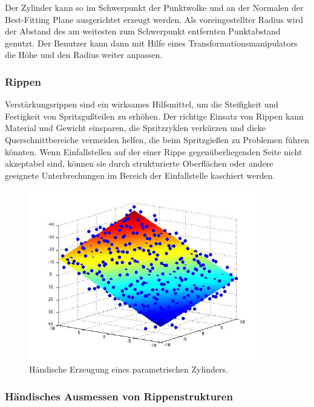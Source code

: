 Der Zylinder kann so im Schwerpunkt der Punktwolke und an der Normalen der Best-Fitting Plane ausgerichtet erzeugt werden. Als voreingestellter Radius wird der Abstand des am weitesten zum Schwerpunkt entfernten Punktabstand genutzt.
Der Benutzer kann dann mit Hilfe eines Transformationsmanipulators die Höhe und den Radius weiter anpassen.

\subsubsection{Rippen}
Verst\"arkungsrippen sind ein wirksames Hilfsmittel, um die Steifigkeit und Festigkeit von Spritzgu{\ss}teilen zu erhöhen.
Der richtige Einsatz von Rippen kann Material und Gewicht einsparen, die Spritzzyklen verkürzen und dicke Querschnittbereiche vermeiden helfen, die beim Spritzgie{\ss}en zu Problemen führen könnten. Wenn Einfallstellen auf der einer Rippe
gegen\"uberliegenden Seite nicht akzeptabel sind, k\"onnen sie durch strukturierte Oberflächen oder andere geeignete Unterbrechungen im Bereich der Einfallstelle kaschiert werden.






\begin{figure}[ht]
\centering
\includegraphics[width=10cm]{graphics/planefit.jpg}
\caption{H\"andische Erzeugung eines parametrischen Zylinders.}
\label{fig2}
\end{figure}



\subsubsection{H\"andisches Ausmessen von Rippenstrukturen}
\label{ribMeasure}

